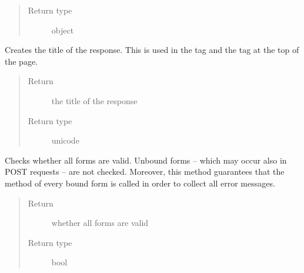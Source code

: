 \documentclass[a4paper,11pt,english]{sphinxmanual}
\begin{document}
\begin{fulllineitems}
\begin{fulllineitems}
\begin{quote}
\begin{description}
\item[{Return type}] \leavevmode
object

\end{description}\end{quote}

\end{fulllineitems}


\begin{fulllineitems}
\label{programming/class-based_views:samples.utils.views.class_views.ProcessWithoutSamplesView.get_title}
Creates the title of the response.  This is used in the 
tag and the  tag at the top of the page.
\begin{quote}\begin{description}
\item[{Return}] \leavevmode
the title of the response

\item[{Return type}] \leavevmode
unicode

\end{description}\end{quote}

\end{fulllineitems}


\begin{fulllineitems}
\label{programming/class-based_views:samples.utils.views.class_views.ProcessWithoutSamplesView.is_all_valid}
Checks whether all forms are valid.  Unbound forms – which may occur also in
POST requests – are not checked.  Moreover, this method guarantees that
the  method of every bound form is called in order
to collect all error messages.
\begin{quote}\begin{description}
\item[{Return}] \leavevmode
whether all forms are valid

\item[{Return type}] \leavevmode
bool

\end{description}\end{quote}

\end{fulllineitems}


\end{fulllineitems}
\end{document}

